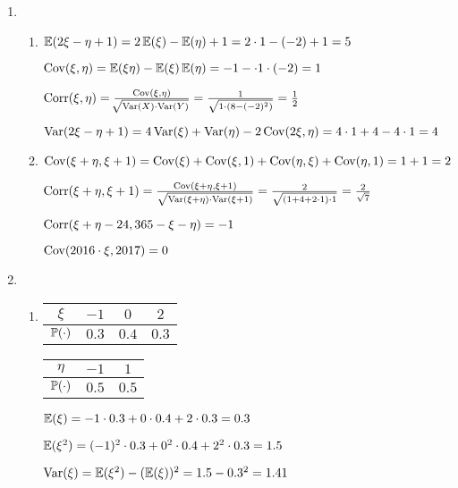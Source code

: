 \begin{enumerate}
\item \begin{enumerate}
\item $\E (2\xi - \eta +1) = 2 \E (\xi) - \E (\eta) + 1 = 2\cdot 1 - (-2) + 1 = 5 $

$\Cov (\xi, \eta) = \E (\xi \eta) - \E(\xi) \E(\eta) = -1 - \cdot 1 \cdot (-2) = 1$

$\Corr (\xi, \eta) = \frac{\Cov(\xi, \eta)}{\sqrt[]{\Var(X) \cdot \Var(Y)}} = \frac{1}{\sqrt{1 \cdot (8-(-2)^2)}} = \frac{1}{2}$

$\Var (2\xi - \eta + 1) = 4\Var(\xi) + \Var(\eta) - 2 \Cov (2\xi, \eta) = 4 \cdot 1 + 4 - 4 \cdot 1 = 4$

\item $\Cov(\xi + \eta, \xi + 1) = \Cov(\xi) + \Cov(\xi, 1) + \Cov(\eta, \xi) + \Cov(\eta, 1) = 1 +1 = 2$

$\Corr(\xi + \eta , \xi + 1) = \frac{\Cov(\xi + \eta , \xi + 1)}{\sqrt{\Var(\xi + \eta)\cdot \Var (\xi + 1)}} = \frac{2}{\sqrt{(1+4+2\cdot 1) \cdot 1}} = \frac{2}{\sqrt{7}}$

$\Corr(\xi + \eta - 24, 365 - \xi - \eta) = -1$

$\Cov(2016\cdot \xi, 2017) = 0$

\end{enumerate}
\item \begin{enumerate}
\item
\begin{center}
\begin{tabular}{cccc}
\toprule
$\xi$ & $-1$ & $0$ & $2$ \\ \midrule
$\P(\cdot)$ & $0.3$ & $0.4$ & $0.3$ \\ \bottomrule
\end{tabular}
\hspace{1cm}
\begin{tabular}{ccc}
\toprule
$\eta$ & $-1$ & $1$ \\ \midrule
$\P(\cdot)$ & $0.5$ & $0.5$ \\ \bottomrule
\end{tabular}
\end{center}

$\E(\xi) = -1 \cdot 0.3 + 0 \cdot 0.4 + 2 \cdot 0.3 = 0.3$

$\E (\xi^2) = (-1)^2 \cdot 0.3 + 0^2 \cdot 0.4 + 2^2 \cdot 0.3 = 1.5$

$\Var(\xi) = \E(\xi^2) - (\E(\xi))^2 = 1.5 - 0.3^2 = 1.41$


\end{enumerate}
\end{enumerate}
